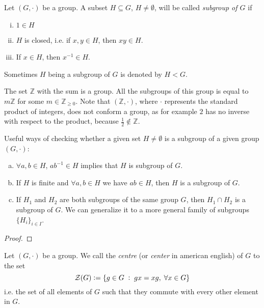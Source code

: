 \documentclass[../main.tex]{subfiles}
\begin{document}
\begin{defi}
[Subgroup] Let $(G,\cdotp)$ be a group. A subset $H\subseteq G$, $H\not=\emptyset$, will be called \textit{subgroup of $G$} if
\begin{enumerate}[(i)]
    \item $1\in H$
    \item $H$ is closed, i.e. if $x,y\in H$, then $xy\in H$.
    \item If $x\in H$, then $x^{-1}\in H$.
\end{enumerate}
Sometimes $H$ being a subgroup of $G$ is denoted by $H<G$.
\end{defi}

\begin{ej}
The set $\mathbb{Z}$ with the sum is a group. All the subgroups of this group is equal to $m\mathbb{Z}$ for some $m\in \mathbb{Z}_{\geq 0}$. Note that $(\mathbb{Z},\cdotp)$, where $\cdotp$ represents the standard product of integers, does not conform a group, as for example $2$ has no inverse with respect to the product, because $\frac{1}{2}\not\in\mathbb{Z}$.
\end{ej}

\begin{prop}
Useful ways of checking whether a given set $H\not=\emptyset$ is a subgroup of a given group $(G,\cdotp)$:
\begin{enumerate}[(a)]
    \item $\forall a,b\in H$, $ab^{-1}\in H$ implies that $H$ is subgroup of $G$.
    \item If $H$ is finite and $\forall a,b\in H$ we have $ab\in H$, then $H$ is a subgroup of $G$.
    \item If $H_1$ and $H_2$ are both subgroups of the same group $G$, then $H_1\cap H_2$ is a subgroup of $G$. We can generalize it to a more general family of subgroups $\{H_i\}_{i\in I}$.
\end{enumerate}
\end{prop}
\begin{proof}
\noproof
\end{proof}


\begin{defi}
[Centre] Let $(G,\cdotp)$ be a group. We call the \textit{centre} (or \textit{center} in american english) of $G$ to the set
\begin{equation}
    \notag
    \mathcal{Z}(G) :=\{g\in G\;:\;gx = xg,\;\forall x\in G\}
\end{equation}
i.e. the set of all elements of $G$ such that they commute with every other element in $G$.
\end{defi}
\end{document}
